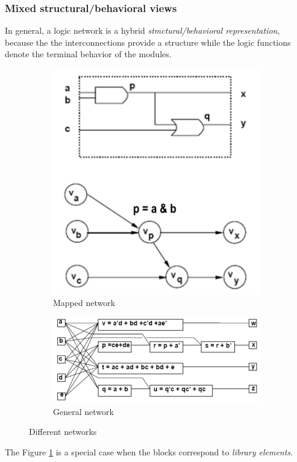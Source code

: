 \subsubsection{Mixed structural/behavioral views}
In general, a logic network is a hybrid \textit{stmctural/behavioral representation}, because the the interconnections provide a structure while the logic functions denote the terminal behavior of the modules.
\begin{figure}[H]
    \centering
    \begin{subfigure}[b]{0.4\textwidth}
        \includegraphics[width=\textwidth]{./Cap2/Images/Image02.png}
        \caption{Mapped network}
        \label{fig:map}
    \end{subfigure}
    \begin{subfigure}[b]{0.4\textwidth}
        \includegraphics[width=\textwidth]{./Cap2/Images/Image03.png}
        \caption{General network}
        \label{fig:gen}
    \end{subfigure}
    \caption{Different networks}
    \label{fig:nets}
\end{figure}
The Figure \ref{fig:map} is a special case when the blocks correspond to \textit{library elements}.


